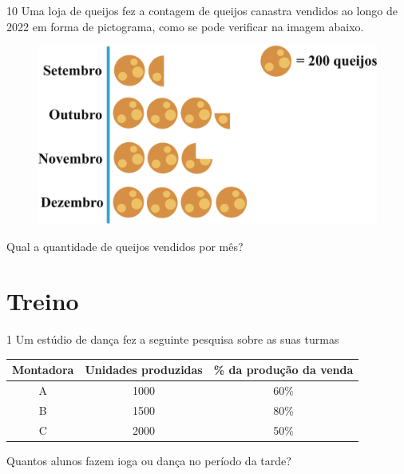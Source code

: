 

\pagebreak
\num{10} Uma loja de queijos fez a contagem de queijos canastra vendidos ao
longo de 2022 em forma de pictograma, como se pode verificar na imagem abaixo. 

\begin{figure}[htpb!]
\centering
\includegraphics[width=\textwidth]{./ilustras-mat/modulo_13-atividade_10.png}
\end{figure}

Qual a quantidade de queijos vendidos por mês?


\section*{Treino}

\num{1}
  Um estúdio de dança fez a seguinte pesquisa sobre as suas turmas 

\begin{center}
\begin{tabular}{c|c|c}
\hline
\multicolumn{1}{|c|}{\textbf{Montadora}} & \textbf{Unidades produzidas} & \multicolumn{1}{c|}{\textbf{\% da produção da venda}} \\ \hline
A & 1000 & 60\% \\ \hline
B & 1500 & 80\% \\ \hline
C & 2000 & 50\% \\ \hline
\end{tabular}
\end{center}

Quantos alunos fazem ioga ou dança no período da tarde?

